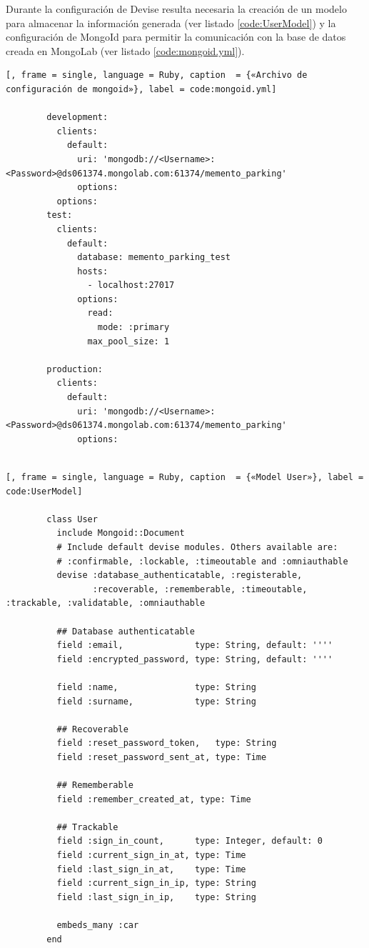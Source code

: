 	Durante la configuración de Devise resulta necesaria la creación de un modelo para almacenar la información generada (ver listado \ref{code:UserModel}) y la configuración de MongoId para permitir la comunicación con la base de datos creada en MongoLab (ver listado \ref{code:mongoid.yml}).
	
	\begin{lstlisting}[, frame = single, language = Ruby, caption  = {«Archivo de configuración de mongoid»}, label = code:mongoid.yml]
		
		development:
		  clients:
		    default:
		      uri: 'mongodb://<Username>:<Password>@ds061374.mongolab.com:61374/memento_parking'
		      options:
		  options:
		test:
		  clients:
		    default:
		      database: memento_parking_test
		      hosts:
		        - localhost:27017
		      options:
		        read:
		          mode: :primary
		        max_pool_size: 1
		
		production:
		  clients:
		    default:
		      uri: 'mongodb://<Username>:<Password>@ds061374.mongolab.com:61374/memento_parking'
		      options:
		
	\end{lstlisting}
	
	\begin{lstlisting}[, frame = single, language = Ruby, caption  = {«Model User»}, label = code:UserModel]
		
		class User
		  include Mongoid::Document
		  # Include default devise modules. Others available are:
		  # :confirmable, :lockable, :timeoutable and :omniauthable
		  devise :database_authenticatable, :registerable,
		         :recoverable, :rememberable, :timeoutable, :trackable, :validatable, :omniauthable
		
		  ## Database authenticatable
		  field :email,              type: String, default: ''''
		  field :encrypted_password, type: String, default: ''''
		
		  field :name,               type: String
		  field :surname,            type: String
		
		  ## Recoverable
		  field :reset_password_token,   type: String
		  field :reset_password_sent_at, type: Time
		
		  ## Rememberable
		  field :remember_created_at, type: Time
		
		  ## Trackable
		  field :sign_in_count,      type: Integer, default: 0
		  field :current_sign_in_at, type: Time
		  field :last_sign_in_at,    type: Time
		  field :current_sign_in_ip, type: String
		  field :last_sign_in_ip,    type: String
		  
		  embeds_many :car
		end
		
	\end{lstlisting}	
	
